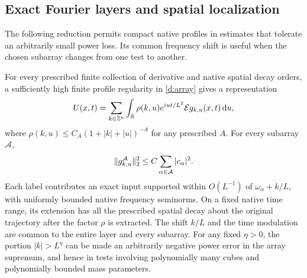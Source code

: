 \subsection{Exact Fourier layers and spatial localization}

The following reduction permits compact native profiles in estimates
that tolerate an arbitrarily small power loss.  Its common frequency
shift is useful when the chosen subarray changes from one test to
another.

\begin{lemma}
\label{d:layers}
For every prescribed finite collection of derivative and native spatial
decay orders, a sufficiently high finite profile regularity in
\eqref{d:array} gives a representation
\begin{equation}
 U(x,t)=\sum_{k\in\mathbb Z^n}\int_\mathbb R
       \rho(k,u)e^{iu t/L^2}\mathcal E g_{k,u}(x,t)\,\mathrm d u,
 \label{d:layer-representation}
\end{equation}
where $\rho(k,u)\le C_A(1+|k|+|u|)^{-A}$ for any prescribed $A$.
For every subarray $\mathcal A$,
\begin{equation}
 \lVert g_{k,u}^{\mathcal A}\rVert_2^2
       \le C\sum_{\alpha\in\mathcal A}|c_\alpha|^2.
 \label{d:layer-subarray-energy}
\end{equation}
Each label contributes an exact input supported within $O(L^{-1})$ of
$\omega_\alpha+k/L$, with uniformly bounded native frequency
seminorms.  On a fixed native time range, its extension has all the
prescribed spatial decay about the original trajectory after the
factor $\rho$ is extracted.  The shift $k/L$ and the time modulation
are common to the entire layer and every subarray.  For any fixed
$\eta>0$, the portion $|k|>L^\eta$ can be made an arbitrarily negative
power error in the array supremum, and hence in tests involving
polynomially many cubes and polynomially bounded mass parameters.
\end{lemma}

